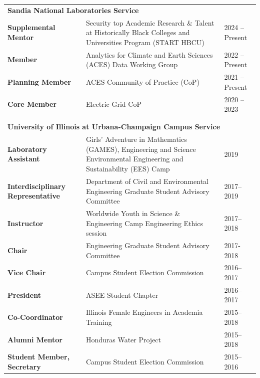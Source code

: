 \documentclass{article}[12pt]
\begin{document}
	\vspace{-2em}
	\noindent
	\begin{flushleft}
		\begin{tabularx}{\textwidth}{lXl}
			\multicolumn{3}{l}{\large{\textbf{Sandia National Laboratories Service}}}\\
			\textbf{Supplemental Mentor} & Security top Academic Research \& Talent at Historically Black Colleges and Universities Program (START HBCU) &  2024 -- Present \\
			\textbf{Member} & Analytics for Climate and Earth Sciences (ACES) Data Working Group & 2022 -- Present \\
			\textbf{Planning Member} &  ACES Community of Practice (CoP) & 2021 -- Present \\
			\textbf{Core Member} & Electric Grid CoP & 2020 -- 2023 \\
			\\
			\\
			\multicolumn{3}{l}{\large{\textbf{University of Illinois at Urbana-Champaign Campus Service}}}\\ 
			\textbf{Laboratory Assistant} & Girls' Adventure in Mathematics (GAMES), Engineering and Science Environmental Engineering and Sustainability (EES) Camp & 2019 \\
			\textbf{Interdisciplinary Representative} & Department of Civil and Environmental Engineering Graduate Student Advisory Committee & 2017--2019 \\
			\textbf{Instructor} & Worldwide Youth in Science \& Engineering Camp Engineering Ethics session & 2017--2018 \\
			\textbf{Chair} & Engineering Graduate Student Advisory Committee & 2017-2018 \\
			\textbf{Vice Chair} & Campus Student Election Commission & 2016--2017 \\
			\textbf{President} &  ASEE Student Chapter & 2016--2017 \\
			\textbf{Co-Coordinator} & Illinois Female Engineers in Academia Training & 2015--2018 \\
			\textbf{Alumni Mentor} &  Honduras Water Project & 2015--2018 \\
			\textbf{Student Member, Secretary} &  Campus Student Election Commission & 2015--2016 \\

\end{tabularx}
\end{flushleft}
\end{document}
